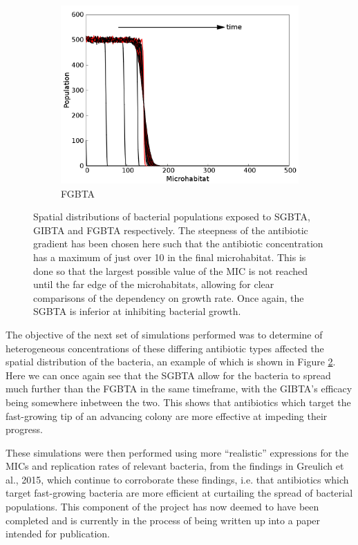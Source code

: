 \documentclass[a4paper,12pt]{article}
\begin{document}
\begin{figure}[H]
\begin{subfigure}[h]{0.3\textwidth}
  \includegraphics[width=\textwidth]{simple-fastGrowers-alpha=0_004884694070738408-spatialDistb}
  \caption{FGBTA}
  \label{subfig:FGBTA-spatdistb-spef_alpha}
 \end{subfigure}
\caption{Spatial distributions of bacterial populations exposed to SGBTA, GIBTA and FGBTA respectively.  The steepness of the antibiotic gradient has been chosen here such that 
the antibiotic concentration has a maximum of just over 10 in the final microhabitat.  This is done so that the largest possible value of the MIC is not reached until the far 
edge of the microhabitats, allowing for clear comparisons of the dependency on growth rate.  Once again, the SGBTA is inferior at inhibiting bacterial growth.}
\label{fig:alpha-spatdistbs}
\end{figure}


The objective of the next set of simulations performed was to determine of heterogeneous concentrations of these differing antibiotic types affected the spatial distribution 
of the bacteria, an example of which is shown in Figure \ref{fig:alpha-spatdistbs}.  Here we can once again see that the SGBTA allow for the bacteria to spread much further than the FGBTA 
in the same timeframe, with the GIBTA's efficacy being somewhere inbetween the two.  This shows that antibiotics which target the fast-growing tip of an advancing colony are more effective 
at impeding their progress.  

These simulations were then performed using more ``realistic'' expressions for the MICs and replication rates of relevant bacteria, from the findings in Greulich et al., 2015, which 
continue to corroborate these findings, i.e. that antibiotics which target fast-growing bacteria are more efficient at curtailing the spread of bacterial populations.  This component 
of the project has now deemed to have been completed and is currently in the process of being written up into a paper intended for publication.
\end{document}
